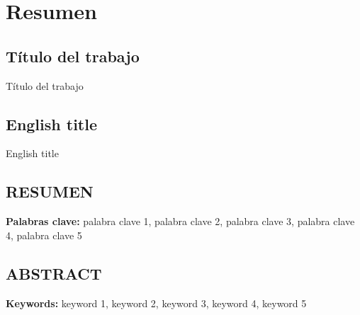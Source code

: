\documentclass[a4paper,11pt]{report}
\begin{document}
\setcounter{page}{1}


% 
% 


\chapter*{Resumen}

\section*{Título del trabajo}
Título del trabajo

\section*{English title}
English title

\section*{RESUMEN}

\lipsum[1]

\vspace{1cm}
\noindent\textbf{Palabras clave:} palabra clave 1, palabra clave 2, palabra clave 3, palabra clave 4, palabra clave 5

\vspace{1cm}

\section*{ABSTRACT}

\lipsum[2]

\vspace{1cm}
\noindent\textbf{Keywords:} keyword 1, keyword 2, keyword 3, keyword 4, keyword 5
\end{document}
